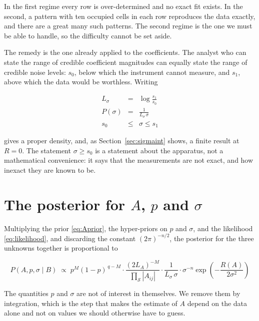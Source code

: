 In the first regime every row is over-determined and no exact fit exists. In the
second, a pattern with ten occupied cells in each row reproduces the data exactly,
and there are a great many such patterns. The second regime is the one we must be
able to handle, so the difficulty cannot be set aside.

The remedy is the one already applied to the coefficients. The analyst who can state
the range of credible coefficient magnitudes can equally state the range of credible
noise levels: $s_{0}$, below which the instrument cannot measure, and $s_{1}$, above
which the data would be worthless. Writing

\begin{eqnarray}
L_{\sigma} &=& \log \frac{s_{1}}{s_{0}}
\label{eq:sigmaprior_A}
\\
P(\sigma) &=& \frac{1}{L_{\sigma}\, \sigma}
\label{eq:sigmaprior_B}
\\
s_{0} &\le& \sigma \le s_{1}
\label{eq:sigmaprior_C}
\end{eqnarray}



gives a proper density, and, as Section~\ref{sec:sigmaint} shows, a finite result at
$R = 0$. The statement $\sigma \ge s_{0}$ is a statement about the apparatus, not a
mathematical convenience: it says that the measurements are not exact, and how
inexact they are known to be.

\section{The posterior for $A$, $p$ and $\sigma$}

Multiplying the prior \eqref{eq:Aprior}, the hyper-priors on $p$ and $\sigma$, and
the likelihood \eqref{eq:likelihood}, and discarding the constant $(2\pi)^{-n/2}$,
the posterior for the three unknowns together is proportional to

\begin{equation}
P(A, p, \sigma \mid B) \;\propto\;
p^{M} (1-p)^{\,q-M}
\cdot \frac{(2L_{A})^{-M}}{\prod_{\mathcal{S}} |A_{ij}|}
\cdot \frac{1}{L_{\sigma}\,\sigma}
\cdot \sigma^{-n} \exp\!\left( -\frac{R(A)}{2\sigma^{2}} \right)
\label{eq:joint}
\end{equation}

The quantities $p$ and $\sigma$ are not of interest in themselves. We remove them by
integration, which is the step that makes the estimate of $A$ depend on the data
alone and not on values we should otherwise have to guess.

